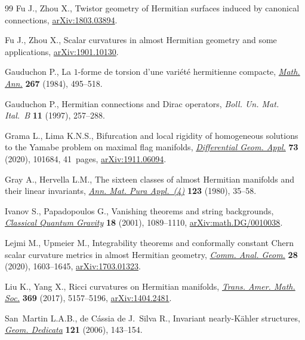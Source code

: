\documentclass[pdftex]{sigma}%
\numberwithin{equation}{section}
\begin{document}
\begin{thebibliography}{99}
Fu J., Zhou X., Twistor geometry of Hermitian surfaces induced by canonical
 connections, \href{https://arxiv.org/abs/1803.03894}{arXiv:1803.03894}.

Fu J., Zhou X., Scalar curvatures in almost Hermitian geometry and some
 applications, \href{https://arxiv.org/abs/1901.10130}{arXiv:1901.10130}.

Gauduchon P., La {$1$}-forme de torsion d'une vari\'et\'e hermitienne compacte,
 \href{https://doi.org/10.1007/BF01455968}{\textit{Math. Ann.}} \textbf{267} (1984), 495--518.

Gauduchon P., Hermitian connections and {D}irac operators, \textit{Boll. Un.
 Mat. Ital.~B} \textbf{11} (1997), 257--288.

Grama L., Lima K.N.S., Bifurcation and local rigidity of homogeneous solutions
 to the {Y}amabe problem on maximal flag manifolds, \href{https://doi.org/10.1016/j.difgeo.2020.101684}{\textit{Differential Geom.
 Appl.}} \textbf{73} (2020), 101684, 41~pages, \href{https://arxiv.org/abs/1911.06094}{arXiv:1911.06094}.

Gray A., Hervella L.M., The sixteen classes of almost {H}ermitian manifolds and
 their linear invariants, \href{https://doi.org/10.1007/BF01796539}{\textit{Ann. Mat. Pura Appl.~(4)}} \textbf{123}
 (1980), 35--58.

Ivanov S., Papadopoulos G., Vanishing theorems and string backgrounds,
 \href{https://doi.org/10.1088/0264-9381/18/6/309}{\textit{Classical Quantum Gravity}} \textbf{18} (2001), 1089--1110,
 \href{https://arxiv.org/abs/math.DG/0010038}{arXiv:math.DG/0010038}.

Lejmi M., Upmeier M., Integrability theorems and conformally constant {C}hern
 scalar curvature metrics in almost {H}ermitian geometry, \href{https://doi.org/10.4310/CAG.2020.v28.n7.a4}{\textit{Comm. Anal.
 Geom.}} \textbf{28} (2020), 1603--1645, \href{https://arxiv.org/abs/1703.01323}{arXiv:1703.01323}.

Liu K., Yang X., Ricci curvatures on {H}ermitian manifolds, \href{https://doi.org/10.1090/tran/7000}{\textit{Trans.
 Amer. Math. Soc.}} \textbf{369} (2017), 5157--5196, \href{https://arxiv.org/abs/1404.2481}{arXiv:1404.2481}.

San~Martin L.A.B., de C\'assia de J.~Silva R., Invariant nearly-{K}\"ahler structures,
 \href{https://doi.org/10.1007/s10711-006-9095-7}{\textit{Geom. Dedicata}} \textbf{121} (2006), 143--154.


\end{thebibliography}
\end{document}
